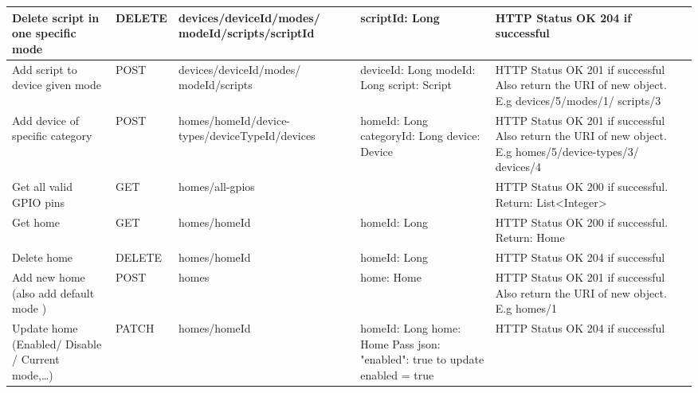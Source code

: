 \documentclass[12pt,a4paper,oneside]{extbook}
\begin{document}
{\begin{longtable}{|p{2.5cm}|p{1.2cm}|p{3.3cm}|p{3cm}|p{4cm}|}
\hline
Delete script in one specific mode &	DELETE &	devices/{deviceId}/modes/
{modeId}/scripts/{scriptId} &	scriptId: Long &	HTTP Status OK 204 if successful\\

\hline
Add script to device given mode &	POST &	devices/{deviceId}/modes/
{modeId}/scripts &	deviceId: Long\newline
modeId: Long\newline
script: Script &	
HTTP Status OK 201 if successful\newline
Also return the URI of new object.\newline
E.g devices/5/modes/1/\newline
scripts/3\\

\hline
Add device of specific category &	POST &	homes/{homeId}/device-types/{deviceTypeId}/\newline devices &	
homeId: Long\newline
categoryId: Long\newline
device: Device	& 
HTTP Status OK 201 if successful\newline
Also return the URI of new object. \newline
E.g\newline
homes/5/device-types/3/\newline
devices/4\\

\hline
Get all valid GPIO pins	& GET &	homes/all-gpios & &		
HTTP Status OK 200 if successful.\newline
Return: List<Integer>\\

\hline
Get home &	GET	& homes/{homeId} &	homeId: Long &	
HTTP Status OK 200 if successful.\newline
Return: Home\\

\hline
Delete home	& DELETE &	homes/{homeId} &	homeId: Long	& HTTP Status OK 204 if successful\\

\hline
Add new home (also add default mode ) &	POST &	homes &	
home: Home &
HTTP Status OK 201 if successful\newline
Also return the URI of new object. \newline
E.g\newline
homes/1\\

\hline
Update home (Enabled/ Disable / Current mode,\dots)	& PATCH	& homes/{homeId} &	
homeId: Long\newline
home: Home\newline
Pass json: {"enabled": true}
to update enabled = true &	HTTP Status OK 204 if successful\\


\end{longtable}}
\end{document}
